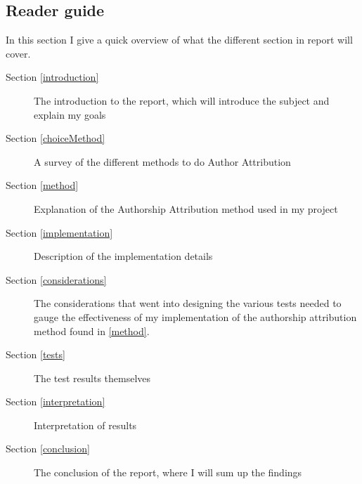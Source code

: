 \subsection{Reader guide}
In this section I give a quick overview of what the different section in report will cover.
\begin{description}
\item[Section \ref{introduction}] The introduction to the report, which will introduce the subject and explain my goals
\item[Section \ref{choiceMethod}] A survey of the different methods to do Author Attribution  
\item[Section \ref{method}] Explanation of the Authorship Attribution method used in my project
\item[Section \ref{implementation}] Description of the implementation details
\item[Section \ref{considerations}] The considerations that went into designing the various tests needed to gauge the effectiveness of my implementation of the authorship attribution method found in \ref{method}.
\item[Section \ref{tests}] The test results themselves
\item[Section \ref{interpretation}] Interpretation of results
\item[Section \ref{conclusion}] The conclusion of the report, where I will sum up the findings  
\end{description}

